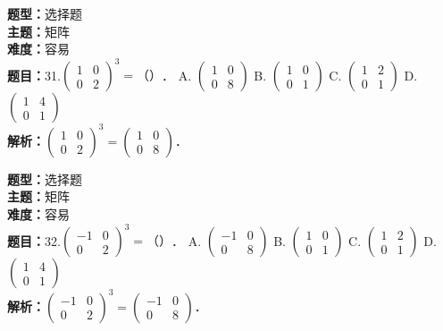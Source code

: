 \documentclass{ctexart}
\newenvironment{question}[5]{%
	\noindent\textbf{题型：}#1\\
	\textbf{主题：}#2\\
	\textbf{难度：}#3\\
	\textbf{题目：}#4\\
	\textbf{解析：}#5\\
	\vspace{1em}
}{}
\begin{document}
	
	
	
	\begin{question}
		{选择题}
		{矩阵}
		{容易}
		{31.\(\left(\begin{array}{ll}1 & 0 \\ 0 & 2\end{array}\right)^3=（）\)．
			A. \(\left(\begin{array}{ll}1 & 0 \\ 0 & 8\end{array}\right)\)
			B. \(\left(\begin{array}{ll}1 & 0 \\ 0 & 1\end{array}\right)\)
			C. \(\left(\begin{array}{ll}1 & 2 \\ 0 & 1\end{array}\right)\)
			D. \(\left(\begin{array}{ll}1 & 4 \\ 0 & 1\end{array}\right)\)}
		{\(\left(\begin{array}{ll}1 & 0 \\ 0 & 2\end{array}\right)^3=\left(\begin{array}{ll}1 & 0 \\ 0 & 8\end{array}\right)\)．}
	\end{question}
	
	\begin{question}
		{选择题}
		{矩阵}
		{容易}
		{32.\(\left(\begin{array}{cc}-1 & 0 \\ 0 & 2\end{array}\right)^3=（）\)．
			A. \(\left(\begin{array}{cc}-1 & 0 \\ 0 & 8\end{array}\right)\)
			B. \(\left(\begin{array}{ll}1 & 0 \\ 0 & 1\end{array}\right)\)
			C. \(\left(\begin{array}{ll}1 & 2 \\ 0 & 1\end{array}\right)\)
			D. \(\left(\begin{array}{ll}1 & 4 \\ 0 & 1\end{array}\right)\)}
		{\(\left(\begin{array}{cc}-1 & 0 \\ 0 & 2\end{array}\right)^3=\left(\begin{array}{cc}-1 & 0 \\ 0 & 8\end{array}\right)\)．}
	\end{question}
	
\end{document}
